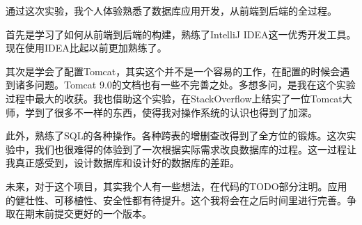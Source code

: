 \documentclass[../report.tex]{subfiles}
\begin{document}
通过这次实验，我个人体验熟悉了数据库应用开发，从前端到后端的全过程。

首先是学习了如何从前端到后端的构建，熟练了IntelliJ IDEA这一优秀开发工具。现在使用IDEA比起以前更加熟练了。

其次是学会了配置Tomcat，其实这个并不是一个容易的工作，在配置的时候会遇到诸多问题。Tomcat 9.0的文档也有一些不完善之处。多想多问，是我在这个实验过程中最大的收获。我也借助这个实验，在StackOverflow上结实了一位Tomcat大师，学到了很多不一样的东西，使得我对操作系统的认识也得到了加深。

此外，熟练了SQL的各种操作。各种跨表的增删查改得到了全方位的锻炼。这次实验中，我们也很难得的体验到了一次根据实际需求改良数据库的过程。这一过程让我真正感受到，设计数据库和设计好的数据库的差距。

未来，对于这个项目，其实我个人有一些想法，在代码的TODO部分注明。应用的健壮性、可移植性、安全性都有待提升。这个我将会在之后时间里进行完善。争取在期末前提交更好的一个版本。
\end{document}
